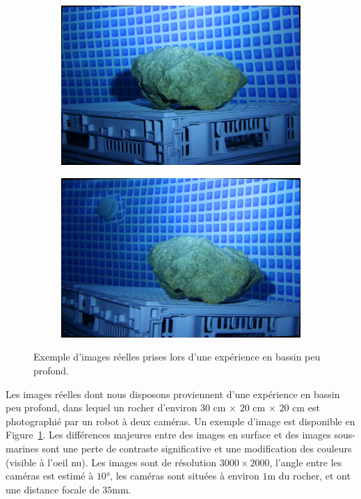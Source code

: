 \documentclass[
	a4paper, %
	10pt, %
	unnumberedsections, %
	twoside, %
]{LTJournalArticle}
\begin{document}
\begin{figure}[H]
	\centering
	\begin{subfigure}[H]{\columnwidth}
		\centering
		\includegraphics[width=\textwidth]{images/scene_l_1_u.jpeg}
	\end{subfigure}
	\begin{subfigure}[H]{\columnwidth}
		\centering
		\includegraphics[width=\textwidth]{images/scene_r_1_u.jpeg}
	\end{subfigure}
	\caption{Exemple d'images réelles prises lors d'une expérience en bassin peu profond.}
	\label{figure:irl_example}
\end{figure}

Les images réelles dont nous disposons proviennent d'une expérience en bassin peu profond,
dans lequel un rocher d'environ $30$ cm $\times$ $20$ cm $\times$ $20$ cm est photographié par un robot à deux caméras.
Un exemple d'image est disponible en Figure~\ref{figure:irl_example}.
Les différences majeures entre des images en surface et des images sous-marines
sont une perte de contraste significative et une modification des couleurs (visible à l'oeil nu).
Les images sont de résolution $3000 \times 2000$, l'angle entre les caméras est estimé à $10$°,
les caméras sont situées à environ $1$m du rocher, et ont une distance focale de $35$mm.
\end{document}
